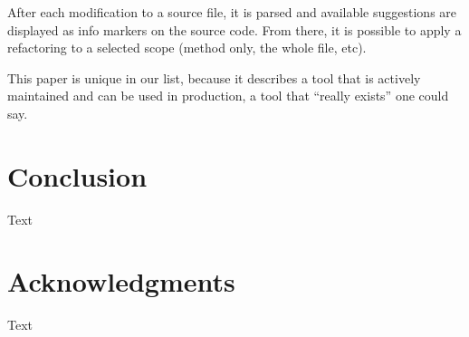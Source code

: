 \documentclass[conference,compsoc,a4paper]{IEEEtran}
\begin{document}
After each modification to a source file, it is parsed and available suggestions are displayed as info markers on the 
source code. From there, it is possible to apply a refactoring to a selected scope (method only, the whole file, etc).

This paper is unique in our list, because it describes a tool that is actively maintained and can be used in 
production, a tool that \enquote{really exists} one could say.


\section{Conclusion}

Text


\section*{Acknowledgments}

Text






\end{document}
